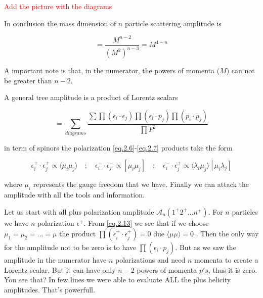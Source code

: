 \textcolor{red}{Add the picture with the diagrams} 



In conclusion the mass dimension of $n$ particle scattering amplitude is 

\begin{equation}
[\mathcal{A}_{n}] = \frac{M^{n-2}}{(M^{2})^{n-3}} = M^{4-n}
\end{equation}


A important note is that, in the numerator, the powers of momenta ($M$) can not be greater than $n-2$. 

A general tree amplitude is a product of Lorentz scalars 



\begin{equation}
[\mathcal{A}_{n}] = \sum_{diagrams} \frac{\sum \prod(\epsilon_{i} \cdot \epsilon_{j}) \prod(\epsilon_{i} \cdot p_{j})\prod(p_{i} \cdot p_{j})}{\prod P^{2}}
\label{eq.2.12}
\end{equation}

in term of spinors the polarization \eqref{eq.2.6}-\eqref{eq.2.7} products take the form 

\begin{equation}
\epsilon_{i}^{+} \cdot \epsilon_{j}^{+}   \propto \langle \mu_{i} \mu_{j} \rangle \quad;\quad \epsilon_{i}^{-} \cdot \epsilon_{j}^{-}   \propto [ \mu_{i} \mu_{j} ] \quad ; \quad \epsilon_{i}^{-} \cdot \epsilon_{j}^{+}   \propto \langle \lambda_{i} \mu_{j} \rangle [\mu_{i}\lambda_{j} ]
\label{eq.2.13}
\end{equation}
 
 where $\mu_{i}$ represents the gauge freedom that we have. Finally we can attack the amplitude with all the tools and information. 
 
 Let us start with all  plus  polarization amplitude $\mathcal{A}_{n}(1^{+}2^{+} \dots n^{+})$. For $n$ particles we have $n$ polarization $\epsilon^{+}$. From \eqref{eq.2.13} we see that if we choose $\mu_{1} =\mu_{2}= \dots = \mu$ the product $\prod(\epsilon_{i}^{+} \cdot \epsilon_{j}^{+}) = 0$ due  $ \langle \mu \mu \rangle = 0$ . Then the only way for the amplitude not to be zero is to have $\prod(\epsilon_{i} \cdot p_{j})$. But as we saw the amplitude in the numerator have $n$ polarizations and need $n$ momenta to create a Lorentz scalar. But it can have only $n-2$ powers of momenta $p's$, thus it is zero. You see that? In few lines we were able to evaluate ALL the plus helicity amplitudes. That's powerfull.
 
